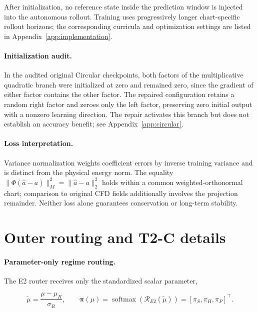 \documentclass{article}
\begin{document}
After initialization, no reference state inside the prediction window is
injected into the autonomous rollout. Training uses progressively longer
chart-specific rollout horizons; the corresponding curricula and
optimization settings are listed in Appendix~\ref{app:implementation}.


\paragraph{Initialization audit.}
In the audited original Circular checkpoints, both factors of the
multiplicative quadratic branch were initialized at zero and remained
zero, since the gradient of either factor contains the other factor.
The repaired configuration retains a random right factor and zeroes only
the left factor, preserving zero initial output with a nonzero learning
direction. The repair activates this branch but does not establish an
accuracy benefit; see Appendix~\ref{app:circular}.

\paragraph{Loss interpretation.}
Variance normalization weights coefficient errors by inverse training
variance and is distinct from the physical energy norm. The equality
$\|\Phi(\widehat a-a)\|_M^2=\|\widehat a-a\|_2^2$ holds within a common
weighted-orthonormal chart; comparison to original CFD fields additionally
involves the projection remainder. Neither loss alone guarantees
conservation or long-term stability.

\section{Outer routing and T2-C details}
\label{app:routing}

\paragraph{Parameter-only regime routing.}
The E2 router receives only the standardized scalar parameter,


\begin{equation}
  \widetilde\mu
  =
  \frac{\mu-\mu_R}{\sigma_R},
  \qquad
  \bm\pi(\mu)
  =
  \operatorname{softmax}
  \left(
    \mathcal R_{E2}(\widetilde\mu)
  \right)
  =
  [\pi_S,\pi_H,\pi_P]^\top .
  \label{eq:app_e2_parameter_only}
\end{equation}
\end{document}
